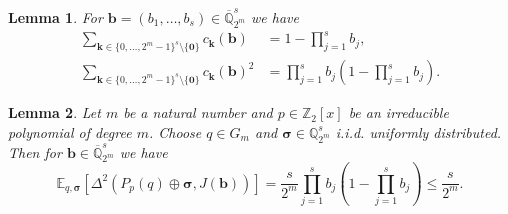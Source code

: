 \documentclass[10pt,a4paper]{amsart}
\newtheorem{lemma}{Lemma}
\begin{document}
\begin{lemma}\label{lem_aux}
For $\bm{b}=(b_1,\ldots,b_s) \in \overline{\mathbb{Q}}_{2^m}^s$ we have
\begin{align*}
\sum_{\bm{k} \in \{0, \ldots, 2^m-1\}^s \setminus\{\bm{0}\}} c_{\bm{k}}(\bm{b}) & = 1 - \prod_{j=1}^s b_j, \\
\sum_{\bm{k} \in \{0, \ldots, 2^m-1\}^s \setminus\{\bm{0}\}} c_{\bm{k}}(\bm{b})^2 & = \prod_{j=1}^s b_j \left( 1 - \prod_{j=1}^s b_j \right).
\end{align*}
\end{lemma}

\begin{lemma}\label{lem_EDelta}
Let $m$ be a natural number and $p \in \mathbb{Z}_2[x]$ be an irreducible polynomial of degree $m$. Choose $q \in G_m$ and $\bm{\sigma} \in \mathbb{Q}_{2^m}^s$ i.i.d. uniformly distributed. Then for  $\bm{b} \in  \overline{\mathbb{Q}}_{2^m}^s$ we have
\begin{equation*}
\mathbb{E}_{q, \bm{\sigma}} [\Delta^2(P_p(q) \oplus \bm{\sigma}, J(\bm{b}))] = \frac{s}{2^m} \prod_{j=1}^s b_j \left( 1 - \prod_{j=1}^s b_j \right) \le \frac{s}{2^m}.
\end{equation*}
\end{lemma}
\end{document}
